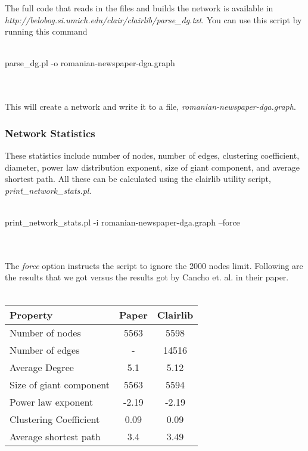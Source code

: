 The full code that reads in the files and builds the network is available in \emph{http://belobog.si.umich.edu/clair/clairlib/parse\_dg.txt}. You can use this script by running this command
\\
\\
\begin{boxedverbatim}
parse_dg.pl -o romanian-newspaper-dga.graph
\end{boxedverbatim}
\\
\\
This will create a network and write it to a file, \emph{romanian-newspaper-dga.graph}.

\subsubsection{Network Statistics}

These statistics include number of nodes, number of edges, clustering coefficient, diameter, power law distribution exponent, size of giant component, and average shortest path. All these can be calculated using the clairlib utility script, \emph{print\_network\_stats.pl}.
\\
\\
\begin{boxedverbatim}
  print_network_stats.pl -i romanian-newspaper-dga.graph --force
\end{boxedverbatim}
\\
\\
The \emph{force} option instructs the script to ignore the 2000 nodes limit. Following are the results that we got versus the results got by Cancho et. al. in their paper.
\\
\\
\begin{tabular}{|l|c|c|}
  \hline
  Property & Paper & Clairlib \\
  \hline
  Number of nodes & 5563 & 5598 \\
  Number of edges & - & 14516 \\
  Average Degree & 5.1 & 5.12 \\
  Size of giant component & 5563 & 5594 \\
  Power law exponent & -2.19 & -2.19 \\
  Clustering Coefficient & 0.09 & 0.09 \\
  Average shortest path & 3.4 & 3.49 \\
  \hline
\end{tabular}
